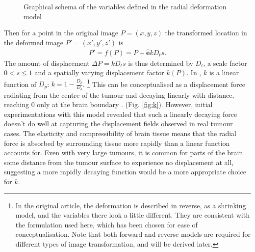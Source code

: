 \documentclass[12pt,phd,a4paper,twoside]{ucl_thesis}
\renewcommand{\textcite}[2][]{
\ifthenelse { \equal {#1} {} }  {\citeauthor{#2}\autocite{#2}}   {\citeauthor{#1}\autocite{#2}}}
\providecommand{\DIFaddtex}[1]{{\protect\color{blue} \sf #1}} %
\providecommand{\DIFdeltex}[1]{{\protect\color{red} \scriptsize #1}} %
\providecommand{\DIFaddbegin}{} %
\providecommand{\DIFaddend}{} %
\providecommand{\DIFdelbegin}{} %
\providecommand{\DIFdelend}{} %
\providecommand{\DIFadd}[1]{\texorpdfstring{\DIFaddtex{#1}}{#1}} %
\providecommand{\DIFdel}[1]{\texorpdfstring{\DIFdeltex{#1}}{}} %
\newcommand{\DIFscaledelfig}{0.5}
\newlength{\DIFdelgraphicswidth} %
\newlength{\DIFdelgraphicsheight} %
\newcommand{\DIFaddincludegraphics}[2][]{{\color{blue}\fbox{\DIFOincludegraphics[#1]{#2}}}} %
\newcommand{\DIFdelincludegraphics}[2][]{%
\sbox{\DIFdelgraphicsbox}{\DIFOincludegraphics[#1]{#2}}%
\settoboxwidth{\DIFdelgraphicswidth}{\DIFdelgraphicsbox} %
\settoboxtotalheight{\DIFdelgraphicsheight}{\DIFdelgraphicsbox} %
\scalebox{\DIFscaledelfig}{%
\parbox[b]{\DIFdelgraphicswidth}{\usebox{\DIFdelgraphicsbox}\\[-\baselineskip] \rule{\DIFdelgraphicswidth}{0em}}\llap{\resizebox{\DIFdelgraphicswidth}{\DIFdelgraphicsheight}{%
\setlength{\unitlength}{\DIFdelgraphicswidth}%
\begin{picture}(1,1)%
\thicklines\linethickness{2pt} %
{\color[rgb]{1,0,0}\put(0,0){\framebox(1,1){}}}%
{\color[rgb]{1,0,0}\put(0,0){\line( 1,1){1}}}%
{\color[rgb]{1,0,0}\put(0,1){\line(1,-1){1}}}%
\end{picture}%
}\hspace*{3pt}}} %
} %
\DeclareRobustCommand{\DIFaddbegin}{\DIFOaddbegin \let\includegraphics\DIFaddincludegraphics} %
\DeclareRobustCommand{\DIFaddend}{\DIFOaddend \let\includegraphics\DIFOincludegraphics} %
\DeclareRobustCommand{\DIFdelbegin}{\DIFOdelbegin \let\includegraphics\DIFdelincludegraphics} %
\DeclareRobustCommand{\DIFdelend}{\DIFOaddend \let\includegraphics\DIFOincludegraphics} %
\begin{document}
\begin{figure}[htp]
  \centering
  
  \caption[Tumour deformation model variables]{Graphical schema of the variables defined in the radial deformation model}
  \label{fig:virtue}
\end{figure}

Then for a point in the original image $P = (x,y,z)$ the transformed location in the deformed image $P' = (x',y',z')$ is
\begin{align}\label{eq:forwardP}
  P' = f(P) = P + \mathbf{\hat{e}}kD_ts.
\end{align}
The amount of displacement $\Delta P = kD_ts$ is thus determined by $D_t$, a scale factor $0<s \leq 1$ and a spatially varying displacement factor $k(P)$.
In \textcite{Nowinski2005}, $k$ is a linear function of $D_p$: $k = 1-\frac{D_p}{D_b}$. \footnote[2]{In the original \textcite{Nowinski2005} article, the deformation is described in reverse, as a shrinking model, and the variables there look a little different. They are consistent with the formulation used here, which has been chosen for ease of conceptualisation. Note that both forward and reverse models are required for different types of image transformation, and will be derived later.}
This can be conceptualised as a displacement force radiating from the centre of the tumour and decaying linearly with distance, reaching 0 only at the brain boundary \DIFdelbegin \DIFdel{.
}\DIFdelend \DIFaddbegin \DIFadd{(Fig. \ref{fig:k}).
}\DIFaddend However, initial experimentations with this model revealed that such a linearly decaying force doesn't do well at capturing the displacement fields observed in real tumour cases.
The elasticity and compressibility of brain tissue means that the radial force is absorbed by surrounding tissue more rapidly than a linear function accounts for.
Even with very large tumours, it is common for parts of the brain some distance from the tumour surface to experience no displacement at all, suggesting a  more rapidly decaying function would be a more appropriate choice for $k$.
\end{document}
